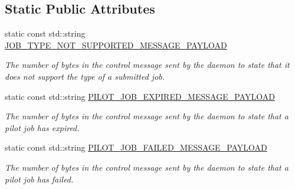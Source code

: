 \subsection*{Static Public Attributes}
\begin{DoxyCompactItemize}
\item 
\mbox{\label{classwrench_1_1_compute_service_message_payload_af1dc4d2c2f784a5b2a29034567254ba7}} 
static const std\+::string \hyperlink{classwrench_1_1_compute_service_message_payload_af1dc4d2c2f784a5b2a29034567254ba7}{J\+O\+B\+\_\+\+T\+Y\+P\+E\+\_\+\+N\+O\+T\+\_\+\+S\+U\+P\+P\+O\+R\+T\+E\+D\+\_\+\+M\+E\+S\+S\+A\+G\+E\+\_\+\+P\+A\+Y\+L\+O\+AD}
\begin{DoxyCompactList}\small\item\em The number of bytes in the control message sent by the daemon to state that it does not support the type of a submitted job. \end{DoxyCompactList}\item 
\mbox{\label{classwrench_1_1_compute_service_message_payload_a1f5b40748d7fe90fb682d735395de3af}} 
static const std\+::string \hyperlink{classwrench_1_1_compute_service_message_payload_a1f5b40748d7fe90fb682d735395de3af}{P\+I\+L\+O\+T\+\_\+\+J\+O\+B\+\_\+\+E\+X\+P\+I\+R\+E\+D\+\_\+\+M\+E\+S\+S\+A\+G\+E\+\_\+\+P\+A\+Y\+L\+O\+AD}
\begin{DoxyCompactList}\small\item\em The number of bytes in the control message sent by the daemon to state that a pilot job has expired. \end{DoxyCompactList}\item 
\mbox{\label{classwrench_1_1_compute_service_message_payload_a6b614da3139f4735421ed8e918556c0c}} 
static const std\+::string \hyperlink{classwrench_1_1_compute_service_message_payload_a6b614da3139f4735421ed8e918556c0c}{P\+I\+L\+O\+T\+\_\+\+J\+O\+B\+\_\+\+F\+A\+I\+L\+E\+D\+\_\+\+M\+E\+S\+S\+A\+G\+E\+\_\+\+P\+A\+Y\+L\+O\+AD}
\begin{DoxyCompactList}\small\item\em The number of bytes in the control message sent by the daemon to state that a pilot job has failed. \end{DoxyCompactList}\item 

\end{DoxyCompactItemize}
